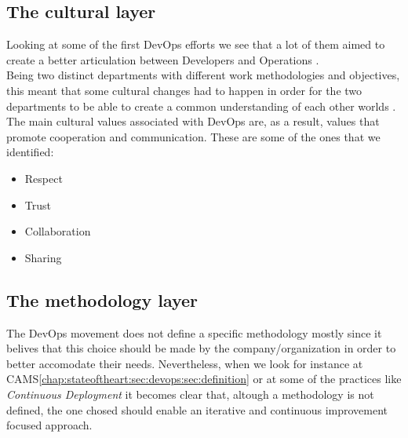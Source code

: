       \subsection{The cultural layer} \label{chap:stateoftheart:sec:devops:sec:culture}
      Looking at some of the first DevOps efforts we see that a lot of them aimed to create a better articulation between Developers and Operations \cite{Debois2008} \cite{Allspaw}.\\
      Being two distinct departments with different work methodologies and objectives, this meant that some cultural changes had to happen in order for the two departments to be able to create a common understanding of each other worlds \cite{Allspaw}.\\
      The main cultural values associated with DevOps are, as a result, values that promote cooperation and communication. These are some of the ones that we identified:
      \begin{itemize}
          \item Respect \cite{Davis2015} \cite{Allspaw}
          \item Trust \cite{Huttermann2012}
          \item Collaboration \cite{Davis2015}
          \item Sharing \cite{Willis2010}
      \end{itemize}

      \subsection{The methodology layer} \label{chap:stateoftheart:sec:devops:sec:methodology}
      The DevOps movement does not define a specific methodology mostly since it belives that this choice should be made by the company/organization in order to better accomodate their needs. Nevertheless, when we look for instance at CAMS\ref{chap:stateoftheart:sec:devops:sec:definition} or at some of the practices like \textit{Continuous Deployment} it becomes clear that, altough a methodology is not defined, the one chosed should enable an iterative and continuous improvement focused approach.

